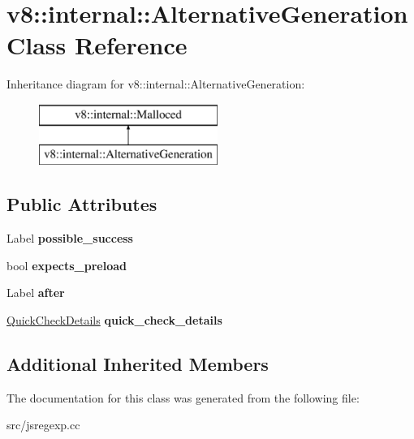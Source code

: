 \hypertarget{classv8_1_1internal_1_1_alternative_generation}{}\section{v8\+:\+:internal\+:\+:Alternative\+Generation Class Reference}
\label{classv8_1_1internal_1_1_alternative_generation}
Inheritance diagram for v8\+:\+:internal\+:\+:Alternative\+Generation\+:\begin{figure}[H]
\begin{center}
\leavevmode
\includegraphics[height=2.000000cm]{classv8_1_1internal_1_1_alternative_generation}
\end{center}
\end{figure}
\subsection*{Public Attributes}
\begin{DoxyCompactItemize}
\item 
\hypertarget{classv8_1_1internal_1_1_alternative_generation_a6b2881c2cd1292cb0423fd4dab2ca823}{}Label {\bfseries possible\+\_\+success}\label{classv8_1_1internal_1_1_alternative_generation_a6b2881c2cd1292cb0423fd4dab2ca823}

\item 
\hypertarget{classv8_1_1internal_1_1_alternative_generation_a71eb17f16f4e5201f9f251c9fe74a507}{}bool {\bfseries expects\+\_\+preload}\label{classv8_1_1internal_1_1_alternative_generation_a71eb17f16f4e5201f9f251c9fe74a507}

\item 
\hypertarget{classv8_1_1internal_1_1_alternative_generation_a5640bb3e3f745d0b4705cd21ae741361}{}Label {\bfseries after}\label{classv8_1_1internal_1_1_alternative_generation_a5640bb3e3f745d0b4705cd21ae741361}

\item 
\hypertarget{classv8_1_1internal_1_1_alternative_generation_a727fcad75b108bd5288f5771aae86831}{}\hyperlink{classv8_1_1internal_1_1_quick_check_details}{Quick\+Check\+Details} {\bfseries quick\+\_\+check\+\_\+details}\label{classv8_1_1internal_1_1_alternative_generation_a727fcad75b108bd5288f5771aae86831}

\end{DoxyCompactItemize}
\subsection*{Additional Inherited Members}


The documentation for this class was generated from the following file\+:\begin{DoxyCompactItemize}
\item 
src/jsregexp.\+cc\end{DoxyCompactItemize}
